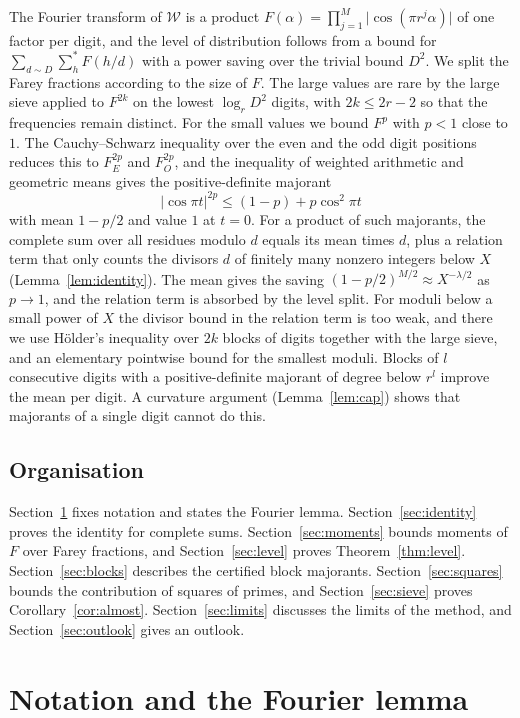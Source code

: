\documentclass[11pt]{amsart}
\theoremstyle{definition}
\numberwithin{equation}{section}
\newcommand{\WW}{\mathcal{W}}
\begin{document}
The Fourier transform of $\WW$ is a product $F(\alpha)=\prod_{j=1}^M\lvert\cos(\pi r^j\alpha)\rvert$ of one factor per digit, and the level of distribution follows from a bound for $\sum_{d\sim D}\sum^*_hF(h/d)$ with a power saving over the trivial bound $D^2$. We split the Farey fractions according to the size of $F$. The large values are rare by the large sieve applied to $F^{2k}$ on the lowest $\log_rD^2$ digits, with $2k\le2r-2$ so that the frequencies remain distinct. For the small values we bound $F^p$ with $p<1$ close to $1$. The Cauchy--Schwarz inequality over the even and the odd digit positions reduces this to $F_E^{2p}$ and $F_O^{2p}$, and the inequality of weighted arithmetic and geometric means gives the positive-definite majorant
\[
\lvert\cos\pi t\rvert^{2p}\le(1-p)+p\cos^2\pi t
\]
with mean $1-p/2$ and value $1$ at $t=0$. For a product of such majorants, the complete sum over all residues modulo $d$ equals its mean times $d$, plus a relation term that only counts the divisors $d$ of finitely many nonzero integers below $X$ (Lemma~\ref{lem:identity}). The mean gives the saving $(1-p/2)^{M/2}\approx X^{-\lambda/2}$ as $p\to1$, and the relation term is absorbed by the level split. For moduli below a small power of $X$ the divisor bound in the relation term is too weak, and there we use H\"older's inequality over $2k$ blocks of digits together with the large sieve, and an elementary pointwise bound for the smallest moduli. Blocks of $l$ consecutive digits with a positive-definite majorant of degree below $r^l$ improve the mean per digit. A curvature argument (Lemma~\ref{lem:cap}) shows that majorants of a single digit cannot do this.

\subsection{Organisation}

Section~\ref{sec:notation} fixes notation and states the Fourier lemma. Section~\ref{sec:identity} proves the identity for complete sums. Section~\ref{sec:moments} bounds moments of $F$ over Farey fractions, and Section~\ref{sec:level} proves Theorem~\ref{thm:level}. Section~\ref{sec:blocks} describes the certified block majorants. Section~\ref{sec:squares} bounds the contribution of squares of primes, and Section~\ref{sec:sieve} proves Corollary~\ref{cor:almost}. Section~\ref{sec:limits} discusses the limits of the method, and Section~\ref{sec:outlook} gives an outlook.

\section{Notation and the Fourier lemma}\label{sec:notation}
\end{document}
